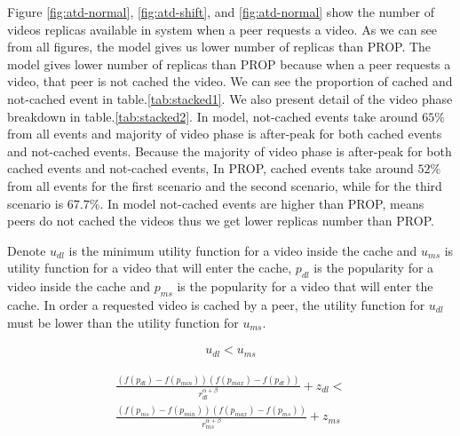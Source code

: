 \documentclass[10pt,final,journal,a4paper]{IEEEtran}
\begin{document}


Figure \ref{fig:atd-normal}, \ref{fig:atd-shift}, and \ref{fig:atd-normal} show the number of  videos replicas available in system when a peer requests a video.
As we can see from all figures, the model gives us lower number of replicas than PROP.
The model gives lower number of replicas than PROP because when a peer requests a video, that peer is not cached the video.
We can see the proportion of cached and not-cached event in table.\ref{tab:stacked1}. 
We also present detail of the video phase breakdown in table.\ref{tab:stacked2}.
In model, not-cached events take around $65\%$ from all events and majority of video phase is  after-peak for both cached events and not-cached events. 
Because the majority of video phase is  after-peak for both cached events and not-cached events, 
In PROP, cached events take around $52\%$ from all events for the first scenario and the second scenario, while for the third scenario is $67.7\%$.
In model not-cached events are higher than PROP, means peers do not cached the videos thus we get lower replicas number than PROP.


Denote $u_{dl}$ is the minimum utility function for a video inside the cache and $u_{ms}$ is utility function for a video that will enter the cache,  $p_{dl}$ is the popularity for a video inside the cache and $p_{ms}$ is the popularity for a video that will enter the cache.
In order a requested video is cached by a peer, the utility function for $u_{dl}$ must be lower than the utility function for $u_{ms}$.

\begin{align}\label{eq:dlms_1}
u_{dl} < u_{ms}
\end{align}

\begin{multline}\label{eq:dlms_2}
\frac{ (f(p_{dl}) - f(p_{min})) (f(p_{max}) - f(p_{dl})) }{r^{\alpha + \beta}_{dl}} + z_{dl} < \\
\frac{ (f(p_{ms}) - f(p_{min})) (f(p_{max}) - f(p_{ms})) }{r^{\alpha + \beta}_{ms}} + z_{ms}
\end{multline}
\end{document}
